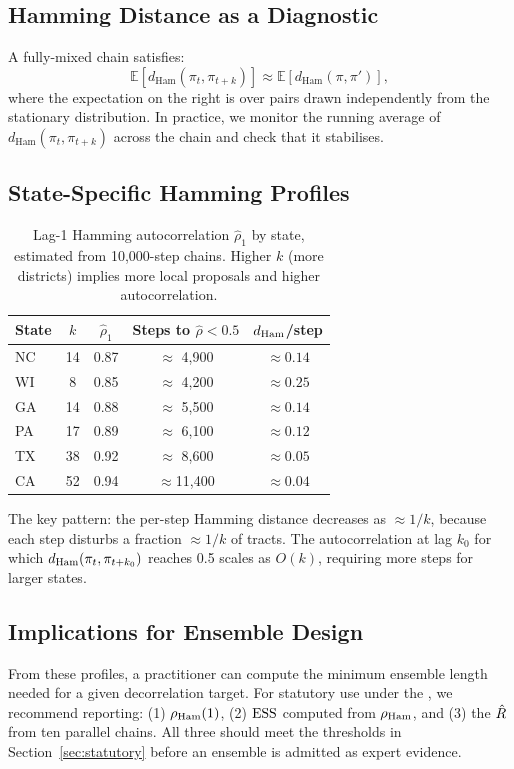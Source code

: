 \subsection{Hamming Distance as a Diagnostic}

A fully-mixed chain satisfies:
\[
  \mathbb{E}[d_{\mathrm{Ham}}(\pi_t, \pi_{t+k})] \approx
  \mathbb{E}[d_{\mathrm{Ham}}(\pi, \pi')],
\]
where the expectation on the right is over pairs drawn independently from
the stationary distribution.
In practice, we monitor the running average of $d_{\mathrm{Ham}}(\pi_t, \pi_{t+k})$
across the chain and check that it stabilises.

\subsection{State-Specific Hamming Profiles}

\begin{table}[h]
\centering
\caption{Lag-1 Hamming autocorrelation $\hat{\rho}_1$ by state,
         estimated from 10{,}000-step chains.
         Higher $k$ (more districts) implies more local proposals and
         higher autocorrelation.}
\label{tab:hamming}
\begin{tabular}{lcccc}
\toprule
State & $k$ & $\hat{\rho}_1$ & Steps to $\hat{\rho} < 0.5$ & $d_{\rm Ham}$/step \\
\midrule
NC & 14 & 0.87 & $\approx$ 4{,}900 & $\approx 0.14$ \\
WI &  8 & 0.85 & $\approx$ 4{,}200 & $\approx 0.25$ \\
GA & 14 & 0.88 & $\approx$ 5{,}500 & $\approx 0.14$ \\
PA & 17 & 0.89 & $\approx$ 6{,}100 & $\approx 0.12$ \\
TX & 38 & 0.92 & $\approx$ 8{,}600 & $\approx 0.05$ \\
CA & 52 & 0.94 & $\approx$11{,}400 & $\approx 0.04$ \\
\bottomrule
\end{tabular}
\end{table}

The key pattern: the per-step Hamming distance decreases as $\approx 1/k$,
because each \recom{} step disturbs a fraction $\approx 1/k$ of tracts.
The autocorrelation at lag $k_0$ for which $d_{\rm Ham}(\pi_t, \pi_{t+k_0})$
reaches 0.5 scales as $O(k)$, requiring more steps for larger states.

\subsection{Implications for Ensemble Design}

From these profiles, a practitioner can compute the minimum ensemble
length needed for a given decorrelation target.
For statutory use under the \dia{}, we recommend reporting:
(1) $\rho_{\mathrm{Ham}}(1)$, (2) $\mathrm{ESS}$ computed from $\rho_{\mathrm{Ham}}$, and (3) the $\hat{R}$
from ten parallel chains.
All three should meet the thresholds in Section~\ref{sec:statutory}
before an ensemble is admitted as expert evidence.
